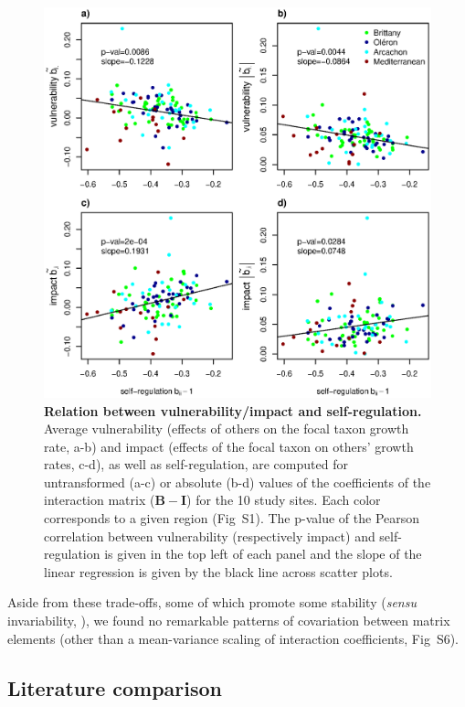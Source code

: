 \documentclass[10pt]{article}
\begin{document}
\begin{figure}[!h]
\centering
\includegraphics[width=\textwidth]{pencen_generality_vs_vulnerability_MainFig}
\caption{\textbf{Relation between vulnerability/impact and self-regulation.}
Average vulnerability (effects of others on the focal taxon growth
rate, a-b) and impact (effects of the focal taxon on others' growth
rates, c-d), as well as self-regulation, are computed for untransformed
(a-c) or absolute (b-d) values of the coefficients of the interaction
matrix ($\mathbf{B}-\mathbf{I}$) for the 10 study sites. Each color
corresponds to a given region (Fig~S1). The p-value
of the Pearson correlation between vulnerability (respectively impact)
and self-regulation is given in the top left of each panel and the
slope of the linear regression is given by the black line across scatter
plots.}
\label{fig:Vulnerability_impact}
\end{figure}

Aside from these trade-offs, some of which promote some stability
(\emph{sensu} invariability, \citealt{Arnoldi431296}), we found no
remarkable patterns of covariation between matrix elements (other
than a mean-variance scaling of interaction coefficients, Fig~S6).

\subsection*{Literature comparison}
\end{document}
